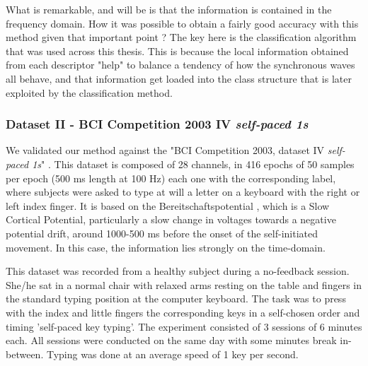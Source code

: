 What is remarkable, and will be is that the information is contained in the frequency domain.  How it was possible to obtain a fairly good accuracy with this method given that important point ?  The key here is the classification algorithm that was used across this thesis.  This is because the local information obtained from each descriptor "help" to balance a tendency of how the synchronous waves all behave, and that information get loaded into the class structure that is later exploited by the classification method.

\subsubsection{Dataset II - BCI Competition 2003 IV \textit{self-paced 1s}}
We validated our method against the "BCI Competition 2003, dataset IV \textit{self-paced 1s}" \cite{c51}. This dataset is composed of 28 channels, in 416 epochs of 50 samples per epoch (500 ms length at 100 Hz) each one with the corresponding label, where subjects were asked to type at will a letter on a keyboard with the right or left index finger.  It is based on the Bereitschaftspotential \cite{c52}, which is a Slow Cortical Potential, particularly a slow change in voltages towards a negative potential drift, around 1000-500 ms before the onset of the self-initiated movement.  In this case, the information lies strongly on the time-domain.

This dataset was recorded from a healthy subject during a no-feedback session. She/he sat in a normal chair with relaxed arms resting on the table and fingers in the standard typing position at the computer keyboard. The task was to press with the index and little fingers the corresponding keys in a self-chosen order and timing 'self-paced key typing'. The experiment consisted of 3 sessions of 6 minutes each. All sessions were conducted on the same day with some minutes break in-between. Typing was done at an average speed of 1 key per second.  
